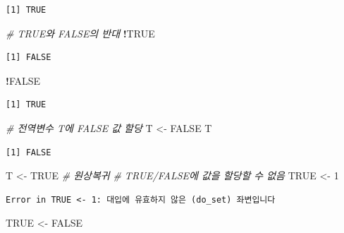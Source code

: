 \documentclass[
  11pt,
]{krantz}
\newenvironment{Shaded}{\begin{snugshade}}{\end{snugshade}}
\newcommand{\CommentTok}[1]{\textcolor[rgb]{0.37,0.37,0.37}{\textit{#1}}}
\newcommand{\DecValTok}[1]{\textcolor[rgb]{0.06,0.06,0.06}{#1}}
\newcommand{\NormalTok}[1]{#1}
\newcommand{\OperatorTok}[1]{\textcolor[rgb]{0.43,0.43,0.43}{\textbf{#1}}}
\newcommand{\OtherTok}[1]{\textcolor[rgb]{0.37,0.37,0.37}{#1}}
\newcommand{\StringTok}[1]{\textcolor[rgb]{0.5,0.5,0.5}{#1}}
\begin{document}
\begin{verbatim}
[1] TRUE
\end{verbatim}

\begin{Shaded}
\begin{Highlighting}[]
\CommentTok{# TRUE와 FALSE의 반대}
\OperatorTok{!}\OtherTok{TRUE}
\end{Highlighting}
\end{Shaded}

\begin{verbatim}
[1] FALSE
\end{verbatim}

\begin{Shaded}
\begin{Highlighting}[]
\OperatorTok{!}\OtherTok{FALSE}
\end{Highlighting}
\end{Shaded}

\begin{verbatim}
[1] TRUE
\end{verbatim}

\begin{Shaded}
\begin{Highlighting}[]
\CommentTok{# 전역변수 T에 FALSE 값 할당}
\NormalTok{T <-}\StringTok{ }\OtherTok{FALSE}
\NormalTok{T}
\end{Highlighting}
\end{Shaded}

\begin{verbatim}
[1] FALSE
\end{verbatim}

\begin{Shaded}
\begin{Highlighting}[]
\NormalTok{T <-}\StringTok{ }\OtherTok{TRUE}  \CommentTok{# 원상복귀}
\CommentTok{# TRUE/FALSE에 값을 할당할 수 없음}
\OtherTok{TRUE}\NormalTok{ <-}\StringTok{ }\DecValTok{1}
\end{Highlighting}
\end{Shaded}

\begin{verbatim}
Error in TRUE <- 1: 대입에 유효하지 않은 (do_set) 좌변입니다
\end{verbatim}

\begin{Shaded}
\begin{Highlighting}[]
\OtherTok{TRUE}\NormalTok{ <-}\StringTok{ }\OtherTok{FALSE}
\end{Highlighting}
\end{Shaded}
\end{document}
